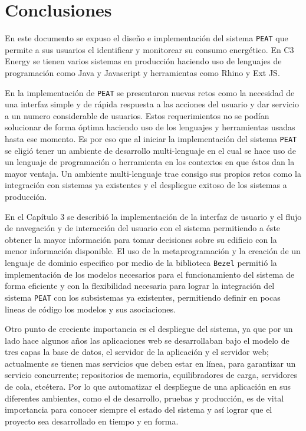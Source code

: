 \chapter{Conclusiones}

En este documento se expuso el diseño e implementación del sistema \texttt{PEAT} que
permite a sus usuarios el identificar y monitorear su consumo energético. En C3
Energy se tienen varios sistemas en producción haciendo uso de lenguajes de
programación como Java y Javascript y herramientas como Rhino y Ext JS.

En la implementación de \texttt{PEAT} se presentaron nuevas retos como la necesidad
de una interfaz simple y de rápida respuesta a las acciones del usuario y
dar servicio a un numero considerable de usuarios.
Estos requerimientos no se podían solucionar de forma óptima haciendo uso de los
lenguajes y herramientas usadas hasta ese momento. Es por eso que al iniciar
la implementación del sistema \texttt{PEAT} se eligió tener un ambiente de
desarrollo multi-lenguaje en el cual se hace uso de un lenguaje de programación
o herramienta en los contextos en que éstos dan la mayor ventaja. Un ambiente
multi-lenguaje trae consigo sus propios retos como la integración con sistemas ya
existentes y el despliegue exitoso de los sistemas a producción.

En el Capítulo 3 se describió la implementación de la interfaz de usuario y el flujo
de navegación y de interacción del usuario con el sistema permitiendo a éste obtener
la mayor información para tomar decisiones sobre su edificio con la menor información
disponible. El uso de la metaprogramación y la creación de un lenguaje de
dominio especifico por medio de la biblioteca \texttt{Bezel} permitió la
implementación de los modelos necesarios para el funcionamiento del sistema
de forma eficiente y con la flexibilidad necesaria para lograr la integración
del sistema \texttt{PEAT} con los subsistemas ya existentes, permitiendo
definir en pocas lineas de código los modelos y sus asociaciones.

Otro punto de creciente importancia es el despliegue del sistema, ya que por
un lado hace algunos años las aplicaciones web se desarrollaban bajo el modelo
de tres capas la base de datos, el servidor de la aplicación y el servidor web;
actualmente se tienen mas servicios que deben estar en línea, para garantizar un
servicio concurrente; repositorios de memoria, equilibradores de carga, servidores
de cola, etcétera. Por lo que automatizar el despliegue de una aplicación en sus
diferentes ambientes, como el de desarrollo, pruebas y producción, es de vital
importancia para conocer siempre el estado del sistema y así lograr que el proyecto
sea desarrollado en tiempo y en forma.

